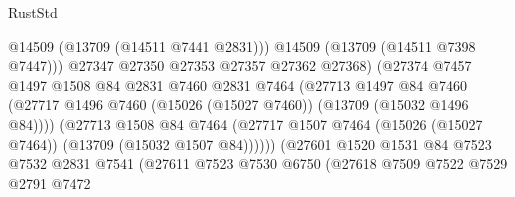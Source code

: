 \begin{lexlean}{RustStd}
\begin{coremodule}
                                          @14509
                                          (@13709 (@14511 @7441 @2831)))
                                        @14509
                                        (@13709 (@14511 @7398 @7447)))
                                      @27347
                                      @27350
                                      @27353
                                      @27357
                                      @27362
                                      @27368)
                                    (@27374
                                      @7457
                                      @1497
                                      @1508
                                      @84
                                      @2831
                                      @7460
                                      @2831
                                      @7464
                                      (@27713
                                        @1497
                                        @84
                                        @7460
                                        (@27717
                                          @1496
                                          @7460
                                          (@15026 (@15027 @7460))
                                          (@13709 (@15032 @1496 @84))))
                                      (@27713
                                        @1508
                                        @84
                                        @7464
                                        (@27717
                                          @1507
                                          @7464
                                          (@15026 (@15027 @7464))
                                          (@13709 (@15032 @1507 @84))))))
                                  (@27601
                                    @1520
                                    @1531
                                    @84
                                    @7523
                                    @7532
                                    @2831
                                    @7541
                                    (@27611
                                      @7523
                                      @7530
                                      @6750
                                      (@27618
                                        @7509
                                        @7522
                                        @7529
                                        @2791
                                        @7472

\end{coremodule}
\end{lexlean}
